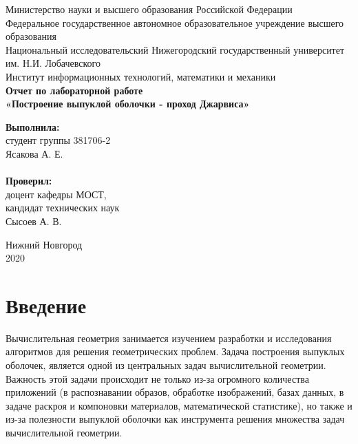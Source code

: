 \documentclass{article}
\begin{document}
\begin{titlepage}

\begin{center}
Министерство науки и высшего образования Российской Федерации \\
\vspace{5mm}
Федеральное государственное автономное образовательное учреждение высшего образования \\
Национальный исследовательский Нижегородский государственный университет им. Н.И. Лобачевского \\
\vspace{1cm}
Институт информационных технологий, математики и механики \\
\vspace{5cm}
\textbf{\large Отчет по лабораторной работе} \\
\vspace{8mm}
\textbf{\Large «Построение выпуклой оболочки - проход Джарвиса»} \\
\end{center}

\vspace{3cm}

\newbox{\lbox}
\newlength{\maxl}
\setlength{\maxl}{\wd\lbox}
\hfill\parbox{7cm}{
\hspace*{5cm}\hspace*{-5cm}\textbf{Выполнила:} \\ студент группы 381706-2 \\ Ясакова А. Е.\\
\\
\hspace*{5cm}\hspace*{-5cm}\textbf{Проверил:}\\ доцент кафедры МОСТ, \\ кандидат технических наук \\ Сысоев А. В.
}

\vspace{\fill}

\begin{center}
Нижний Новгород \\ 2020
\end{center}
\end{titlepage}

\setcounter{page}{2}

\tableofcontents

\newpage

\section{Введение}
Вычислительная геометрия занимается изучением разработки и исследования алгоритмов для решения геометрических проблем. Задача построения выпуклых оболочек, является одной из центральных задач вычислительной геометрии. Важность этой задачи происходит не только из-за огромного количества приложений (в распознавании образов, обработке изображений, базах данных, в задаче раскроя и компоновки материалов, математической статистике), но также и из-за полезности выпуклой оболочки как инструмента решения множества задач вычислительной геометрии.
\end{document}
